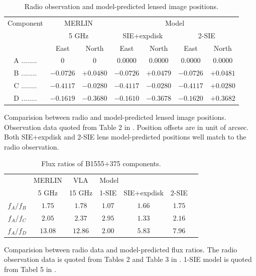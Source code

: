 \documentclass[useAMS,usenatbib]{mn2e}
\begin{document}
\begin{table}
 \begin{minipage}{140mm}
  \caption{Radio observation and model-predicted lensed image positions.}
  \begin{tabular}{@{}ccccccc}

\hline

Component	&\multicolumn{2}{c}{MERLIN} 	 & \multicolumn{4}{c}{Model} \\
					&\multicolumn{2}{c}{5 GHz}		&	\multicolumn{2}{c}{SIE+expdisk} &\multicolumn{2}{c}{ 2-SIE}		\\
					 &East &North &East 		&North &East 		&North\\ 
\hline
A ........ &$0$    		&$0$		&$0.0000$ &$0.0000$   &   $0.0000$   &  $ 0.0000$\\  
B ........ &$-0.0726$ 	&$+0.0480$	&$-0.0726$ &$+0.0479$ & $-0.0726 $  &  $+0.0481$  \\  
C ........ &$-0.4117$  &$-0.0280$	&$-0.4117$ &$-0.0280$  & $-0.4117 $  &   $+0.0280$ \\  
D ........ &$-0.1619$  &$-0.3680$	&$-0.1610$ &$-0.3678$  & $-0.1620$    &  $+0.3682$ \\  
\hline
\end{tabular}

\end{minipage}
\medskip

Comparision between radio and model-predicted lensed image positions. Observation data quoted from Table 2 in \citet{Marlow}. Position offsets are in unit of arcsec. Both SIE+expdisk and 2-SIE lens model-predicted positions well match to the radio observation.

\end{table}

\begin{table}
  \caption{Flux ratios of B1555+375 components.}
  \begin{tabular}{@{}ccccccc}

\hline
	& MERLIN & VLA & \multicolumn{3}{l}{Model}\\
		&5 GHz & 15 GHz  & 1-SIE & SIE+expdisk & 2-SIE\\
\hline
$f_A/f_B$			&$1.75$ & $1.78$ &$1.07$& $1.66$ & $1.75$ \\ 
$f_A/f_C$		&$2.05$ 	&$2.37$ &$2.95$ & $1.33$ & $2.16$\\
$f_A/f_D$		&$13.08$ &$ 12.86$ &$2.00$& $5.83$ & $7.96$\\

\hline
\end{tabular}

\medskip
Comparision between radio data and model-predicted flux ratios. The radio observation data is quoted from Tables 2 and Table 3 in \citet{Marlow}. 1-SIE model is quoted from Tabel 5 in \citet{Marlow}.

\end{table}
\end{document}
